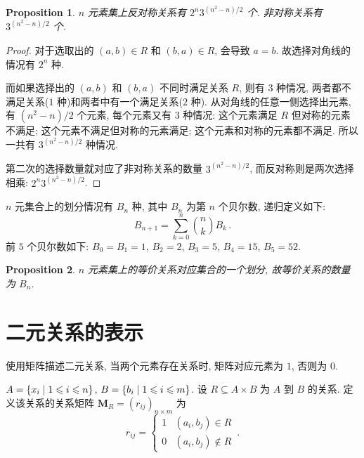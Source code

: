 \documentclass[UTF8]{ctexart}
\theoremstyle{mystyle}
\newtheorem{proposition}{Proposition}[section]
\theoremstyle{myremark}
\theoremstyle{plain}
\newcommand{\ve}[1]{\boldsymbol{\mathbf{#1}}}
\DeclarePairedDelimiter\set{\{}{\}}
\begin{document}
\begin{proposition}
    $ n $ 元素集上反对称关系有 $ 2^n 3^{(n^2-n)/2} $ 个. 非对称关系有 $ 3^{(n^2-n)/2} $ 个.
\end{proposition}

\begin{proof}
    对于选取出的 $ (a, b) \in R $ 和 $ (b, a) \in R $, 会导致 $ a = b $. 故选择对角线的情况有 $ 2^n $ 种.

    而如果选择出的 $ (a, b) $ 和 $ (b, a) $ 不同时满足关系 $ R $, 则有 $ 3 $ 种情况, 两者都不满足关系($ 1 $ 种)和两者中有一个满足关系($ 2 $ 种). 从对角线的任意一侧选择出元素, 有 $ (n^2 - n)/2 $ 个元素, 每个元素又有 $ 3 $ 种情况: 这个元素满足 $ R $ 但对称的元素不满足; 这个元素不满足但对称的元素满足; 这个元素和对称的元素都不满足. 所以一共有 $ 3^{(n^2 - n)/2} $ 种情况.

    第二次的选择数量就对应了非对称关系的数量 $ 3^{(n^2 - n)/2} $, 而反对称则是两次选择相乘: $ 2^n 3^{(n^2-n)/2} $.
\end{proof}


\begin{definition}
    $ n $ 元集合上的划分情况有 $ B_n $ 种, 其中 $ B_n $ 为第 $ n $ 个贝尔数, 递归定义如下: \[ B_{n+1} = \sum_{k=0}^{n} \binom{n}{k} B_k \,.\] 前 $ 5 $ 个贝尔数如下: $ B_0 = B_1 = 1 $, $ B_2 = 2 $, $ B_3 = 5 $, $ B_4 = 15 $, $ B_5 = 52 $.
\end{definition}


\begin{proposition}
    $ n $ 元素集上的等价关系对应集合的一个划分, 故等价关系的数量为 $ B_n $.
\end{proposition}

\section{二元关系的表示}
使用矩阵描述二元关系, 当两个元素存在关系时, 矩阵对应元素为 $ 1 $, 否则为 $ 0 $.
\begin{definition}
    $ A = \set{x_i \mid 1 \leqslant i \leqslant n} $, $ B = \set{b_i \mid 1 \leqslant i \leqslant m} $. 设 $ R \subseteq A \times B $ 为 $ A $ 到 $ B $ 的关系. 定义该关系的关系矩阵 $ \ve M_R = (r_{ij})_{n \times m} $ 为
    \[ r_{ij} = \begin{cases}
        1  & (a_i, b_j) \in R \\
        0  & (a_i, b_j) \notin R
    \end{cases} \,.\]
\end{definition}
\end{document}

